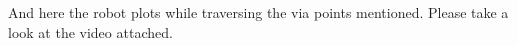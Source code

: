 \documentclass[10pt,a4paper]{article}
\begin{document}
And here the robot plots while traversing the via points mentioned. Please take a look at the video attached.

	\begin{figure}[h]
			\centering
              \\
			  \subfigure[Position 2]{
}
\end{figure}
\end{document}
